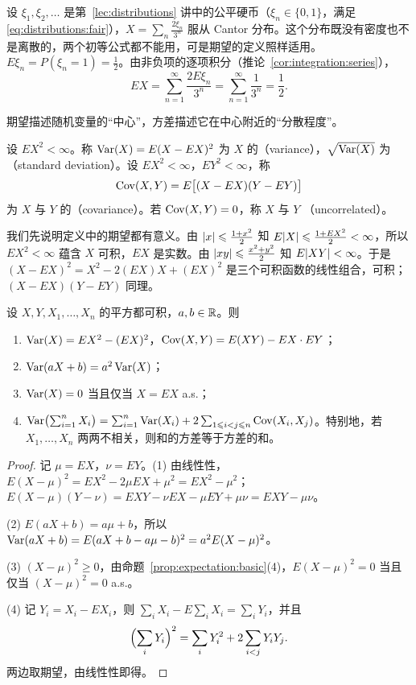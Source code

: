 \begin{example}\label{ex:expectation:cantor}
设 $\xi_1,\xi_2,\dots$ 是第~\ref{lec:distributions} 讲中的公平硬币（$\xi_n\in\{0,1\}$，满足 \eqref{eq:distributions:fair}），$X=\sum_n\frac{2\xi_n}{3^n}$ 服从 Cantor 分布。这个分布既没有密度也不是离散的，两个初等公式都不能用，可是期望的定义照样适用。$E\xi_n=P(\xi_n=1)=\frac12$。由非负项的逐项积分（推论~\ref{cor:integration:series}），
\[
EX=\sum_{n=1}^\infty\frac{2E\xi_n}{3^n}=\sum_{n=1}^\infty\frac1{3^n}=\frac12 .
\]
\end{example}


期望描述随机变量的“中心”，方差描述它在中心附近的“分散程度”。

\begin{definition}[方差与协方差]\label{def:expectation:variance}
设 $EX^2<\infty$。称 $\operatorname{Var}(X)=E(X-EX)^2$ 为 $X$ 的（variance），$\sqrt{\operatorname{Var}(X)}$ 为（standard deviation）。设 $EX^2<\infty$，$EY^2<\infty$，称
\[
\operatorname{Cov}(X,Y)=E\bigl[(X-EX)(Y-EY)\bigr]
\]
为 $X$ 与 $Y$ 的（covariance）。若 $\operatorname{Cov}(X,Y)=0$，称 $X$ 与 $Y$ （uncorrelated）。
\end{definition}

我们先说明定义中的期望都有意义。由 $\lvert x\rvert\leqslant\frac{1+x^2}2$ 知 $E\lvert X\rvert\leqslant\frac{1+EX^2}2<\infty$，所以 $EX^2<\infty$ 蕴含 $X$ 可积，$EX$ 是实数。由 $\lvert xy\rvert\leqslant\frac{x^2+y^2}2$ 知 $E\lvert XY\rvert<\infty$。于是 $(X-EX)^2=X^2-2(EX)X+(EX)^2$ 是三个可积函数的线性组合，可积；$(X-EX)(Y-EY)$ 同理。

\begin{proposition}[方差与协方差的计算公式]\label{prop:expectation:variance}
设 $X,Y,X_1,\dots,X_n$ 的平方都可积，$a,b\in\mathbb{R}$。则
\begin{enumerate}
\item $\operatorname{Var}(X)=EX^2-(EX)^2$，$\operatorname{Cov}(X,Y)=E(XY)-EX\cdot EY$；
\item $\operatorname{Var}(aX+b)=a^2\operatorname{Var}(X)$；
\item $\operatorname{Var}(X)=0$ 当且仅当 $X=EX$ a.s.；
\item $\operatorname{Var}\bigl(\sum_{i=1}^nX_i\bigr)=\sum_{i=1}^n\operatorname{Var}(X_i)+2\sum_{1\leqslant i<j\leqslant n}\operatorname{Cov}(X_i,X_j)$。特别地，若 $X_1,\dots,X_n$ 两两不相关，则和的方差等于方差的和。
\end{enumerate}
\end{proposition}
\begin{proof}
记 $\mu=EX$，$\nu=EY$。(1) 由线性性，$E(X-\mu)^2=EX^2-2\mu EX+\mu^2=EX^2-\mu^2$；$E(X-\mu)(Y-\nu)=EXY-\nu EX-\mu EY+\mu\nu=EXY-\mu\nu$。

(2) $E(aX+b)=a\mu+b$，所以 $\operatorname{Var}(aX+b)=E(aX+b-a\mu-b)^2=a^2E(X-\mu)^2$。

(3) $(X-\mu)^2\geqslant0$，由命题~\ref{prop:expectation:basic}(4)，$E(X-\mu)^2=0$ 当且仅当 $(X-\mu)^2=0$ a.s.。

(4) 记 $Y_i=X_i-EX_i$，则 $\sum_iX_i-E\sum_iX_i=\sum_iY_i$，并且
\[
\Bigl(\sum_iY_i\Bigr)^2=\sum_iY_i^2+2\sum_{i<j}Y_iY_j .
\]
两边取期望，由线性性即得。
\end{proof}

